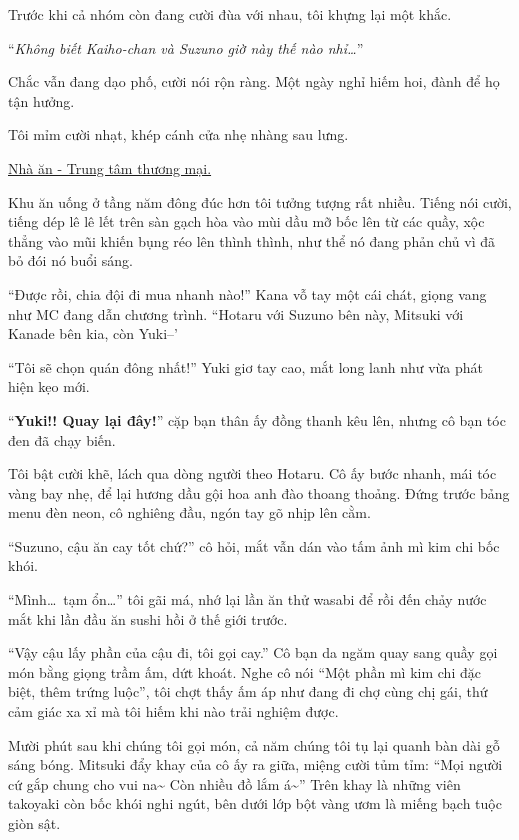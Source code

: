 \documentclass[../main.tex]{subfiles}
\begin{document}
Trước khi cả nhóm còn đang cười đùa với nhau, tôi khựng lại một khắc.

``\textit{Không biết Kaiho-chan và Suzuno giờ này thế nào nhỉ\dots}''

Chắc vẫn đang dạo phố, cười nói rộn ràng. Một ngày nghỉ hiếm hoi, đành để họ tận hưởng.

Tôi mỉm cười nhạt, khép cánh cửa nhẹ nhàng sau lưng.

\begin{center}
  \uline{Nhà ăn - Trung tâm thương mại.}
\end{center}


Khu ăn uống ở tầng năm đông đúc hơn tôi tưởng tượng rất nhiều. Tiếng nói cười, tiếng dép lê lê lết trên sàn gạch hòa vào mùi dầu mỡ bốc lên từ các quầy, xộc thẳng vào mũi khiến bụng réo lên thình thình, như thể nó đang phản chủ vì đã bỏ đói nó buổi sáng.

``Được rồi, chia đội đi mua nhanh nào!'' Kana vỗ tay một cái chát, giọng vang như MC đang dẫn chương trình. ``Hotaru với Suzuno bên này, Mitsuki với Kanade bên kia, còn Yuki--'

``Tôi sẽ chọn quán đông nhất!'' Yuki giơ tay cao, mắt long lanh như vừa phát hiện kẹo mới.

``\textbf{Yuki!! Quay lại đây!}'' cặp bạn thân ấy đồng thanh kêu lên, nhưng cô bạn tóc đen đã chạy biến.

Tôi bật cười khẽ, lách qua dòng người theo Hotaru. Cô ấy bước nhanh, mái tóc vàng bay nhẹ, để lại hương dầu gội hoa anh đào thoang thoảng. Đứng trước bảng menu đèn neon, cô nghiêng đầu, ngón tay gõ nhịp lên cằm.

``Suzuno, cậu ăn cay tốt chứ?'' cô hỏi, mắt vẫn dán vào tấm ảnh mì kim chi bốc khói.

``Mình\dots\ tạm ổn\dots'' tôi gãi má, nhớ lại lần ăn thử wasabi để rồi đến chảy nước mắt khi lần đầu ăn sushi hồi ở thế giới trước.

``Vậy cậu lấy phần của cậu đi, tôi gọi cay.'' Cô bạn da ngăm quay sang quầy gọi món bằng giọng trầm ấm, dứt khoát. Nghe cô nói ``Một phần mì kim chi đặc biệt, thêm trứng luộc'', tôi chợt thấy ấm áp như đang đi chợ cùng chị gái, thứ cảm giác xa xỉ mà tôi hiếm khi nào trải nghiệm được.

\ct

Mười phút sau khi chúng tôi gọi món, cả năm chúng tôi tụ lại quanh bàn dài gỗ sáng bóng. Mitsuki đẩy khay của cô ấy ra giữa, miệng cười tủm tỉm: ``Mọi người cứ gắp chung cho vui na\~{} Còn nhiều đồ lắm á\~{}'' Trên khay là những viên takoyaki còn bốc khói nghi ngút, bên dưới lớp bột vàng ươm là miếng bạch tuộc giòn sật.
\end{document}
